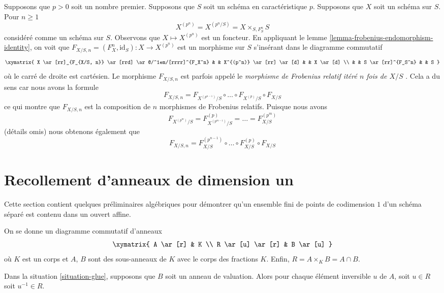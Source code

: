 \begin{remark}
\label{remark-n-fold-relative-frobenius}
Supposons que $p > 0$ soit un nombre premier. Supposons que $S$ soit un schéma
en caractéristique $p$. Supposons que $X$ soit un schéma sur $S$. Pour $n \geq 1$
$$
X^{(p^n)} = X^{(p^n/S)} = X \times_{S, F_S^n} S
$$
considéré comme un schéma sur $S$. Observons que $X \mapsto
X^{(p^n)}$ est un foncteur. En appliquant le lemme
\ref{lemma-frobenius-endomorphism-identity}, on voit que
$F_{X/S, n} = (F_X^n, \text{id}_S) : X \longrightarrow X^{(p^n)}$
est un morphisme sur $S$ s'insérant dans le diagramme commutatif
$$
\xymatrix{
X \ar[rr]_{F_{X/S, n}} \ar[rrd] \ar@/^1em/[rrrr]^{F_X^n}
& & X^{(p^n)} \ar[rr] \ar[d] & & X \ar[d] \\
& & S \ar[rr]^{F_S^n} & & S
}
$$
où le carré de droite est cartésien. Le
morphisme $F_{X/S, n}$ est parfois appelé le {\it
morphisme de Frobenius relatif itéré $n$ fois de
$X/S$ }. Cela a du sens car nous avons la formule
$$
F_{X/S, n} =
F_{X^{(p^{n - 1})}/S} \circ \ldots \circ F_{X^{(p)}/S} \circ F_{X/S}
$$
ce qui montre que $F_{X/S, n}$ est la composition
de $n$ morphismes de Frobenius relatifs. Puisque nous avons
$$
F_{X^{(p^m)}/S} = F_{X^{(p^{m - 1})}/S}^{(p)} = \ldots = F_{X/S}^{(p^m)}
$$
(détails omis) nous obtenons également que
$$
F_{X/S, n} =
F_{X/S}^{(p^{n - 1})} \circ \ldots \circ F_{X/S}^{(p)} \circ F_{X/S}
$$
\end{remark}




\section{Recollement d'anneaux de dimension un}
\label{section-glueing-dim-1}

\noindent
Cette section contient quelques préliminaires algébriques
pour démontrer qu'un ensemble fini de points de codimension
$1$ d'un schéma séparé est contenu dans un ouvert affine.

\begin{situation}
\label{situation-glue}
On se donne un diagramme commutatif d'anneaux
$$
\xymatrix{
A \ar[r] & K \\
R \ar[u] \ar[r] & B \ar[u]
}
$$
où $K$ est un corps et $A$, $B$ sont des sous-anneaux de $K$ avec
le corps des fractions $K$. Enfin, $R = A \times_K B = A \cap B$.
\end{situation}

\begin{lemma}
\label{lemma-glue-valuation-ring}
Dans la situation \ref{situation-glue}, supposons que $B$ soit un anneau de valuation.
Alors pour chaque élément inversible $u$ de $A$, soit $u \in R$ soit $u^{-1} \in R$.
\end{lemma}

